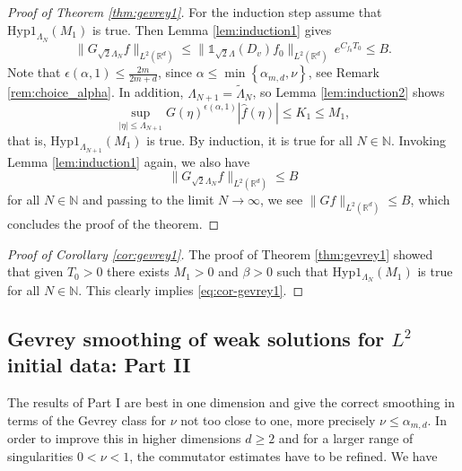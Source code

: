 \documentclass[11pt,a4paper,reqno]{amsart}
\theoremstyle{plain}
\theoremstyle{definition}
\begin{document}
\begin{proof}[Proof of Theorem \ref{thm:gevrey1}]
  For the induction step assume that $\mathrm{Hyp1}_{\Lambda_N}(M_1)$ is true. Then Lemma \ref{lem:induction1} gives
  \begin{equation*}
  	\| G_{\sqrt{2}\Lambda_N} f\|_{L^2({\mathbb{R}}^d)} \le \|{\mathds{1}}_{\sqrt{2}\Lambda}(D_v) f_0\|_{L^2({\mathbb{R}}^d)} \, e^{C_{f_0}T_0} \leq B.
  \end{equation*}
  Note that $\epsilon(\alpha,1)\le \frac{2m}{2m+d}$, since $\alpha\leq \min\left\{\alpha_{m,d},\nu\right\}$, see Remark \ref{rem:choice_alpha}. In addition,
  $\Lambda_{N+1}= \widetilde{\Lambda}_N$, so Lemma \ref{lem:induction2} shows
  \begin{equation*}
  \sup_{|\eta|\le \Lambda_{N+1}} G(\eta)^{\epsilon(\alpha,1)} |\hat{f}(\eta)|
  \le K_1\leq M_1,
  \end{equation*}
  that is, $\mathrm{Hyp1}_{\Lambda_{N+1}}(M_1)$ is true. By induction, it is true for all $N\in{\mathbb{N}}$.
  Invoking Lemma \ref{lem:induction1} again, we also have
  \begin{equation*}
  	\|G_{\sqrt{2}\Lambda_N}f\|_{L^2({\mathbb{R}}^d)} \leq B
  \end{equation*}
  for all $N\in{\mathbb{N}}$ and passing to the limit $N\to\infty$, we see
  $\|Gf\|_{L^2({\mathbb{R}}^d)} \leq B $, which concludes the proof of the theorem.
\end{proof}

\begin{proof}[Proof of Corollary \ref{cor:gevrey1}]
The proof of Theorem \ref{thm:gevrey1} showed that given $T_0>0$ there exists $M_1>0$ and $\beta>0$ such that Hyp$1_{\Lambda_N}(M_1)$ is true for all $N\in{\mathbb{N}}$. This clearly implies \eqref{eq:cor-gevrey1}.
\end{proof}

\subsection{Gevrey smoothing of weak solutions for $L^2$ initial data: Part II}\label{subsec:partii}
The results of Part I are best in one dimension and give the correct smoothing in terms of the Gevrey class for $\nu$ not too close to one, more precisely $\nu\le \alpha_{m,d}$. In order to improve this  in higher dimensions $d\geq 2$ and for a larger range of singularities $0<\nu<1$, the commutator estimates have to be refined. We have
\end{document}
